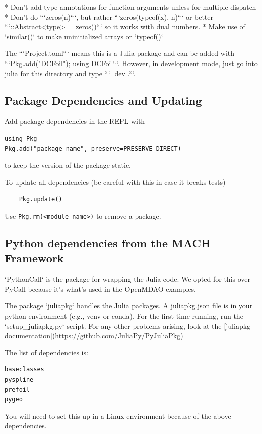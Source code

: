 \documentclass[10pt]{article}
\begin{document}
* Don't add type annotations for function arguments unless for multiple dispatch
* Don't do ```zeros(n)```, but rather ```zeros(typeof(x), n)``` or better ```::Abstract<type> = zeros()``` so it works with dual numbers.
* Make use of `similar()` to make uninitialized arrays or `typeof()`


The ```Project.toml``` means this is a Julia package and can be added with ```Pkg.add("DCFoil"); using DCFoil```.
However, in development mode, just go into julia for this directory and type ```] dev .```.

\subsection{Package Dependencies and Updating}

Add package dependencies in the REPL with

\begin{lstlisting}
using Pkg
Pkg.add("package-name", preserve=PRESERVE_DIRECT)
\end{lstlisting}

to keep the version of the package static.

To update all dependencies (be careful with this in case it breaks tests)

\begin{lstlisting}
	Pkg.update()
\end{lstlisting}

Use \texttt{Pkg.rm(<module-name>)} to remove a package.

\subsection{Python dependencies from the MACH Framework}

`PythonCall` is the package for wrapping the Julia code.
We opted for this over PyCall because it's what's used in the OpenMDAO examples.

The package `juliapkg` handles the Julia packages.
A juliapkg.json file is in your python environment (e.g., venv or conda).
For the first time running, run the `setup\_juliapkg.py` script.
For any other problems arising, look at the [juliapkg documentation](https://github.com/JuliaPy/PyJuliaPkg)

The list of dependencies is:
\begin{lstlisting}
baseclasses
pyspline
prefoil
pygeo
\end{lstlisting}

You will need to set this up in a Linux environment because of the above dependencies.
\end{document}
